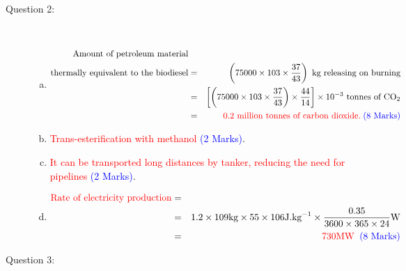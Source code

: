 \documentclass[12pt,twoside]{report}
\newcommand{\frc}{\displaystyle\frac}
\begin{document}
\begin{description}
\begin{enumerate}[(a)]
\end{enumerate}



\clearpage

\item [Question 2:] \mbox{}\\
 
\begin{enumerate}[(a)]
\item 
\begin{eqnarray}
\text{Amount of petroleum material}&& \nonumber \\
\text{thermally equivalent to the biodiesel} &=& \left(75000 \times 103 \times \frc{37}{43} \right) \text{ kg releasing on burning} \nonumber \\
&=& \left[\left( 75000 \times 103 \times \frc{37}{43}\right) \times \frc{44}{14}\right] \times 10^{-3} \text{ tonnes of CO}_{2}  \nonumber \\
&=& \textcolor{red}{0.2 \text{ million tonnes of carbon dioxide.}} \; \textcolor{blue}{\text{(8 Marks)}} \nonumber
\end{eqnarray}

\item \textcolor{red}{Trans-esterification with methanol} \textcolor{blue}{(2 Marks)}.

\item \textcolor{red}{It can be transported long distances by tanker, reducing the need for pipelines} \textcolor{blue}{(2 Marks)}.

\item 
\begin{eqnarray}
 \textcolor{red}{\text{Rate of electricity production}}&=& \nonumber \\
&=& 1.2 \times 109 \text{kg} \times 55 \times 106 \text{J.kg}^{-1}  \times \frc{0.35}{3600 \times 365 \times 24} \text{W} \nonumber \\
&=&  \textcolor{red}{730 \text{MW}}\;\;\textcolor{blue}{\text{(8 Marks)}} \nonumber 
\end{eqnarray}

\end{enumerate}

\clearpage

\item [Question 3:]\mbox{} \\



\end{description}
\end{document}
